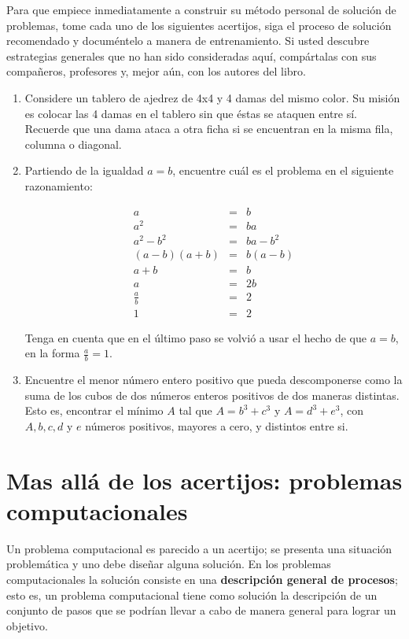 Para que empiece inmediatamente a construir su método personal de solución de
problemas, tome cada uno de los siguientes acertijos, siga el proceso de solución 
recomendado y documéntelo a manera de entrenamiento. Si usted descubre estrategias 
generales que no han sido consideradas aquí, compártalas con sus
compañeros, profesores y, mejor aún, con los autores del libro.


\begin{enumerate}

\item Considere un tablero de ajedrez de 4x4 y 4 damas del mismo color. Su misión
es colocar las 4 damas en el tablero sin que éstas se ataquen entre sí. Recuerde
que una dama ataca a otra ficha si se encuentran en la misma fila, columna o 
diagonal.

\item Partiendo de la igualdad $a=b$, encuentre cuál es el problema en el siguiente
razonamiento:

\begin{eqnarray*}
a & = & b\\
a^{2} & = & ba\\
a^{2}-b^{2} & = & ba-b^{2}\\
(a-b)(a+b) & = & b(a-b)\\
a+b & = & b\\
a & = & 2b\\
\frac{a}{b} & = & 2\\
1 & = & 2
\end{eqnarray*}

Tenga en cuenta que en el último paso se volvió a usar el hecho de que $a=b$, en la
forma $\frac{a}{b}=1$.

\item Encuentre el menor número entero positivo que pueda descomponerse como la
suma de los cubos de dos números enteros positivos de dos maneras distintas. Esto es,
encontrar el mínimo $A$ tal que $A=b^3+c^3$ y $A=d^3+e^3$, con $A,b,c,d$ y $e$ 
números positivos, mayores a cero, y distintos entre si.

\end{enumerate}


\section{Mas allá de los acertijos: problemas computacionales}

Un problema computacional es parecido a un acertijo; se presenta una situación
problemática y uno debe diseñar alguna solución. En los problemas computacionales
la solución consiste en una {\bf descripción general de procesos}; esto es, 
un problema computacional tiene como solución la descripción de un conjunto de 
pasos que se podrían llevar a cabo de manera general para lograr un objetivo.

